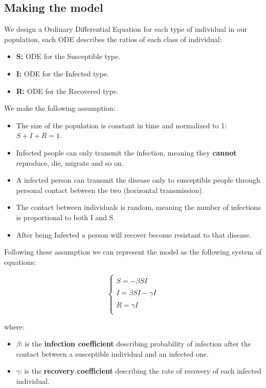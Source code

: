 \subsection{Making the model}
We design a Ordinary Differential Equation for each type of individual in our population, each ODE describes the ratios of each class of individual:

\begin{itemize}
    \item \textbf{S:} ODE for the Susceptible type.
    \item \textbf{I:} ODE for the Infected type.
    \item \textbf{R:} ODE for the Recovered type.
\end{itemize}

We make the following assumption:

\begin{itemize}
    \item The size of the population is constant in time and normalized to 1: $S + I + R = 1$.
    \item Infected people can only transmit the infection, meaning they \textbf{cannot} reproduce, die, migrate and so on.
    \item A infected person can transmit the disease only to susceptible people through personal contact between the two (horizontal transmission).
    \item The contact between individuals is random, meaning the number of infections is proportional to both I and S.
    \item After being Infected a person will recover become resistant to that disease.
\end{itemize}

Following these assumption we can represent the model as the following system of equations:

\[
\begin{cases}
        \dot{S} = - \beta S I \\
        \dot{I} = \beta S I - \gamma I\\
        \dot{R} = \gamma I \\
\end{cases}
\]

where:

\begin{itemize}
    \item $\beta$: is the \textbf{infection coefficient} describing probability of infection after the contact between a susceptible individual and an infected one.
    \item $\gamma$: is the \textbf{recovery coefficient} describing the rate of recovery of each infected individual.
\end{itemize}

